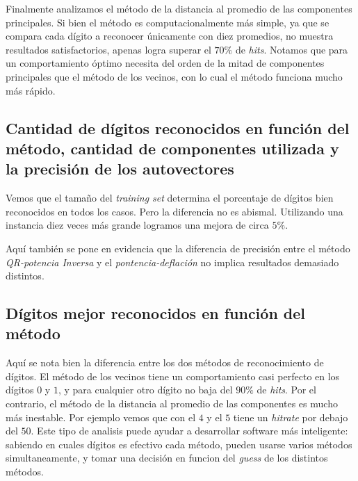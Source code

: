 		Finalmente analizamos el m\'etodo de la distancia al promedio de las componentes
		principales. Si bien el m\'etodo es computacionalmente m\'as simple, ya que se
		compara cada d\'igito a reconocer \'unicamente con diez promedios, no muestra
		resultados satisfactorios, apenas logra superar el $70\%$ de \textit{hits}.
		Notamos que para un comportamiento \'optimo necesita del orden de la mitad de
		componentes principales que el m\'etodo de los vecinos, con lo cual el m\'etodo
		funciona mucho m\'as r\'apido.


	\subsection{Cantidad de d\'igitos reconocidos en funci\'on del m\'etodo,
	cantidad de componentes utilizada y la precisi\'on de los autovectores}

		Vemos que el tama\~no del \textit{training set} determina el porcentaje de d\'igitos bien
		reconocidos en todos los casos. Pero la diferencia no es abismal. Utilizando una instancia
		diez veces m\'as grande logramos una mejora de circa $5\%$.

		Aqu\'i tambi\'en se pone en evidencia que la diferencia de precisi\'on entre el m\'etodo
		\textit{QR-potencia Inversa} y el \textit{pontencia-deflaci\'on} no implica resultados
		demasiado distintos.

	\subsection{D\'igitos mejor reconocidos en funci\'on del m\'etodo}

		Aqu\'i se nota bien la diferencia entre los dos m\'etodos de reconocimiento de
		d\'igitos. El m\'etodo de los vecinos tiene un comportamiento casi perfecto en
		los d\'igitos $0$ y $1$, y para cualquier otro d\'igito no baja del $90\%$ de
		\textit{hits}. Por el contrario, el m\'etodo de la distancia al promedio de las
		componentes es mucho m\'as inestable. Por ejemplo vemos que con el $4$ y el $5$
		tiene un \textit{hitrate} por debajo del $50$. Este tipo de analisis puede ayudar
		a desarrollar software m\'as inteligente: sabiendo en cuales d\'igitos es efectivo
		cada m\'etodo, pueden usarse varios m\'etodos simultaneamente, y tomar una decisi\'on
		en funcion del \textit{guess} de los distintos m\'etodos.
